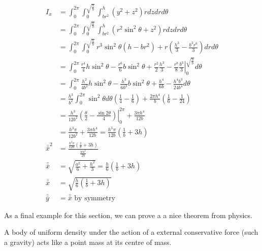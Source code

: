 \documentclass[fleqn,letterpaper]{report}
\begin{document}
\begin{example}
\begin{align*}
I_x & = \int_0^{2\pi} \int_0^{\sqrt{\frac{h}{b}}}
\int_{br^2}^h (y^2 + z^2) r dz dr d\theta \\
& = \int_0^{2\pi} \int_0^{\sqrt{\frac{h}{b}}} \int_{br^2}^h
(r^2 \sin^2 \theta + z^2) r dz dr d\theta \\
& = \int_0^{2\pi} \int_0^{\sqrt{\frac{h}{b}}} r^3 \sin^2 \theta \left( h-
br^2 \right) + r \left( \frac{h^3}{3} -
\frac{b^3r^6}{3}\right) dr d\theta \\
& = \int_0^{2\pi} \left. \frac{r^4}{4} h \sin^2 \theta -
\frac{r^6}{6} b \sin^2 \theta + \frac{r^2}{2}
\frac{h^3}{3} - \frac{r^8}{8} \frac{b^3}{3}
\right|_0^{\sqrt{\frac{h}{b}}} d \theta\\
& = \int_0^{2\pi} \frac{h^2}{4b^2} h \sin^2 \theta -
\frac{h^3}{6b^3} b \sin^2 \theta + \frac{h^4}{6b} - \frac{h^4
b^3}{24 b^4} d\theta \\
& = \frac{h^3}{b^2} \int_0^{2\pi} \sin^2 \theta d \theta \left(
\frac{1}{4} - \frac{1}{6} \right) + \frac{2\pi h^4}{b} \left(
\frac{1}{6} - \frac{1}{24} \right) \\
& = \left. \frac{h^3}{12b^2} \left( \frac{\theta}{2} -
\frac{\sin 2\theta}{4} \right) \right|_0^{2\pi} + \frac{3\pi
h^4}{12b} \\
& = \frac{h^3 \pi}{12b^2} + \frac{3\pi h^4}{12b} = \frac{h^3
\pi}{12b} \left( \frac{1}{b} + 3h \right) \\
\bar{\bar{x}}^2 & = \frac{ \frac{h^3\pi}{12b} \left(
\frac{1}{b} + 3h \right)}{\frac{\pi h^2}{2b}} \\
\bar{\bar{x}} & = \sqrt{\frac{a^2}{6} + \frac{h^2}{3}} =
\frac{h}{6} \left( \frac{1}{b} + 3h \right) \\
\bar{\bar{x}} & = \sqrt{\frac{h}{6} \left( \frac{1}{b} + 3h
\right)} \\
\bar{\bar{y}} & = \bar{\bar{x}} \text{ by symmetry} 
\end{align*}
\end{example}

As a final example for this section, we can prove a a nice theorem
from physics. 

\begin{thm}
A body of uniform density under the
action of a external conservative force (such a gravity) acts like
a point mass at its centre of mass. 
\end{thm}
\end{document}
